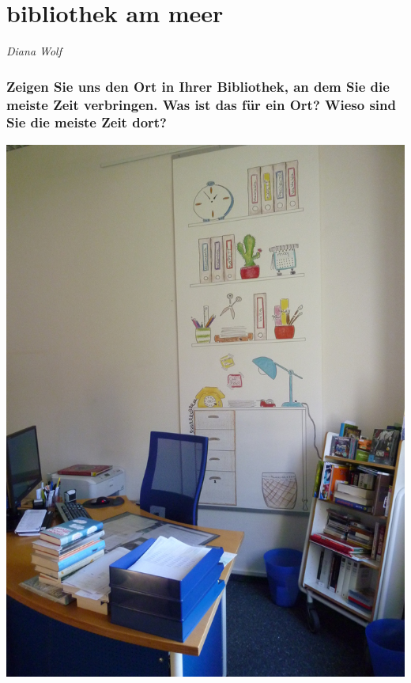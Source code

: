 
\vspace*{.5cm}
\section{bibliothek am meer}
\begin{center}
\emph{Diana Wolf}
\end{center}
\vspace*{1cm}


\hypertarget{zeigen-sie-uns-den-ort-in-ihrer-bibliothek-an-dem-sie-die-meiste-zeit-verbringen.-was-ist-das-fuxfcr-ein-ort-wieso-sind-sie-die-meiste-zeit-dort}{%
\subsubsection*{Zeigen Sie uns den Ort in Ihrer Bibliothek, an dem Sie die
meiste Zeit verbringen. Was ist das für ein Ort? Wieso sind Sie die
meiste Zeit
dort?}\label{zeigen-sie-uns-den-ort-in-ihrer-bibliothek-an-dem-sie-die-meiste-zeit-verbringen.-was-ist-das-fuxfcr-ein-ort-wieso-sind-sie-die-meiste-zeit-dort}}

\begin{center}
\includegraphics{am-meer/img/auskunft.jpg}
\end{center}

